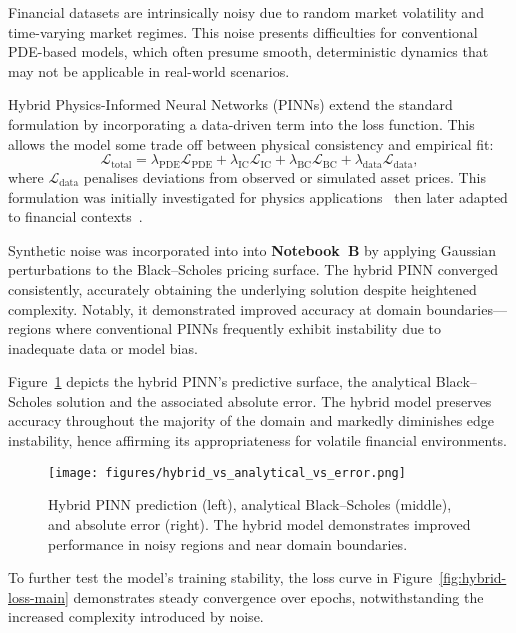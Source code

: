 \documentclass[12pt,a4paper]{article}
\begin{document}
Financial datasets are intrinsically noisy due to random market volatility and time-varying market regimes. This noise presents difficulties for conventional PDE-based models, which often presume smooth, deterministic dynamics that may not be applicable in real-world scenarios. 

Hybrid Physics-Informed Neural Networks (PINNs) extend the standard formulation by incorporating a data-driven term into the loss function. This allows the model some trade off between physical consistency and empirical fit:
\begin{equation}
\mathcal{L}_{\text{total}} = \lambda_{\text{PDE}}\mathcal{L}_{\text{PDE}} + \lambda_{\text{IC}}\mathcal{L}_{\text{IC}} + \lambda_{\text{BC}}\mathcal{L}_{\text{BC}} + \lambda_{\text{data}}\mathcal{L}_{\text{data}},
\label{eq:hybrid-loss}
\end{equation}
where \(\mathcal{L}_{\text{data}}\) penalises deviations from observed or simulated asset prices. This formulation was initially investigated for physics applications~\cite{wight2020solving} then later adapted to financial contexts~\cite{finlay2022train}.

Synthetic noise was incorporated into into \textbf{Notebook~B} by applying Gaussian perturbations to the Black–Scholes pricing surface. The hybrid PINN converged consistently, accurately obtaining the underlying solution despite heightened complexity. Notably, it demonstrated improved accuracy at domain boundaries—regions where conventional PINNs frequently exhibit instability due to inadequate data or model bias.

Figure~\ref{fig:hybrid-surface-main} depicts the hybrid PINN's predictive surface, the analytical Black–Scholes solution and the associated absolute error. The hybrid model preserves accuracy throughout the majority of the domain and markedly diminishes edge instability, hence affirming its appropriateness for volatile financial environments.

\begin{figure}[H]
  \centering
  \texttt{[image: figures/hybrid\_vs\_analytical\_vs\_error.png]}
  \caption{Hybrid PINN prediction (left), analytical Black--Scholes (middle), and absolute error (right). The hybrid model demonstrates improved performance in noisy regions and near domain boundaries.}
  \label{fig:hybrid-surface-main}
\end{figure}

To further test the model's training stability, the loss curve in Figure~\ref{fig:hybrid-loss-main} demonstrates steady convergence over epochs, notwithstanding the increased complexity introduced by noise.
\end{document}

